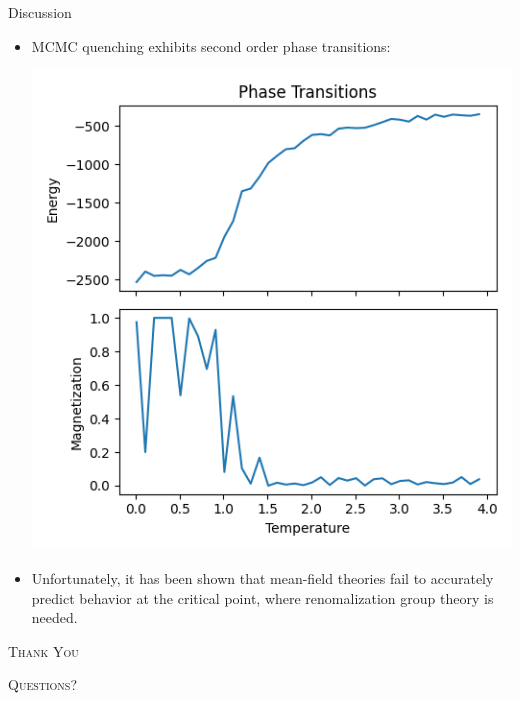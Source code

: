 \documentclass{minesbeamer}
\begin{document}
\begin{frame}{Discussion}
    \begin{itemize}        
        \item MCMC quenching exhibits second order phase transitions:
        \centering

        \includegraphics[height=0.6\textheight]{mcmc_phase.png}
        \item 
        Unfortunately, it has been shown that mean-field theories fail to 
        accurately predict behavior at the critical point, where
        renomalization group theory is needed. 
    \end{itemize}
\end{frame}
\begin{frame}[standout]
    \Huge\textsc{Thank You}
    
    \vfill
    
    \LARGE\textsc{Questions?}
\end{frame}
\end{document}
